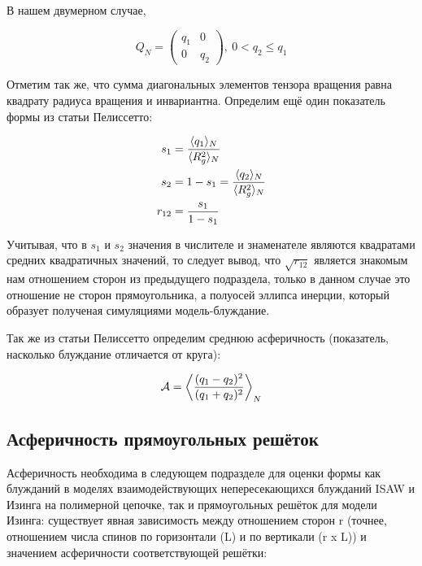В нашем двумерном случае, 

\begin{equation*}
    Q_{N} = \left(
    \begin{array}{cc}
      q_{1} & 0 \\
      0 & q_{2}
    \end{array} \right),\ 0 < q_{2} \leq q_{1}
\end{equation*}

Отметим так же, что сумма диагональных элементов тензора вращения равна квадрату радиуса вращения и инвариантна. Определим ещё один показатель формы из статьи Пелиссетто\cite{caracciolo2011geometrical}:

\begin{align*}
    s_{1} &= \frac{\langle q_{1} \rangle_{N}}{\langle R_{g}^{2} \rangle_{N}}\\
    s_{2} &= 1 - s_{1} = \frac{\langle q_{2} \rangle_{N}}{\langle R_{g}^{2} \rangle_{N}}\\
    r_{12} &= \frac{s_{1}}{1-s_{1}}
\end{align*}

Учитывая, что в $s_{1}$ и $s_{2}$ значения в числителе и знаменателе являются квадратами средних квадратичных значений, то следует вывод, что $\sqrt{r_{12}}$ является знакомым нам отношением сторон из предыдущего подраздела, только в данном случае это отношение не сторон прямоугольника, а полуосей эллипса инерции, который образует полученая симуляциями модель-блуждание.

Так же из статьи Пелиссетто\cite{caracciolo2011geometrical} определим среднюю асферичность (показатель, насколько блуждание отличается от круга):

\begin{equation}
\label{eq:Asphericity}
    \mathcal{A} = \left< \frac{(q_{1} - q_{2})^{2}}{(q_{1} + q_{2})^{2}} \right>_{N}
\end{equation}

\subsection{Асферичность прямоугольных решёток}

Асферичность необходима в следующем подразделе для оценки формы как блужданий в моделях взаимодействующих непересекающихся блужданий ISAW и Изинга на полимерной цепочке, так и прямоугольных решёток для модели Изинга: существует явная зависимость между отношением сторон r (точнее, отношением числа спинов по горизонтали (L) и по вертикали (r x L)) и значением асферичности соответствующей решётки:

